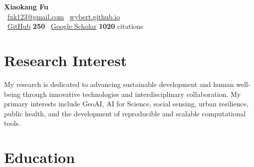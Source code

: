 \documentclass[11pt]{article}
\begin{document}
\begin{center}
	\LARGE\textbf{Xiaokang Fu}\normalsize \\[0.4em]
	{\color{emailcolor}}~\href{mailto:fxk123@gmail.com}{fxk123@gmail.com} \quad
	{\color{webcolor}}~\href{https://wybert.github.io}{wybert.github.io} \\[0.3em]
	{\color{githubcolor}}~\href{https://github.com/wybert}{GitHub} \textbf{250} {\color{starcolor}} \quad
	{\color{googlecolor}}~\href{https://scholar.google.com.hk/citations?user=H9RAbHIAAAAJ}{Google Scholar} \textbf{1020} citations
\end{center}
\vspace{0.5em}

\RaggedRight

\section*{Research Interest}

My research is dedicated to advancing sustainable development and human well-being through innovative technologies and interdisciplinary collaboration. My primary interests include GeoAI, AI for Science, social sensing, urban resilience, public health, and the development of reproducible and scalable computational tools.

\section*{Education}

\renewcommand{\thefootnote}{\fnsymbol{footnote}}
\setcounter{footnote}{0}
\end{document}

